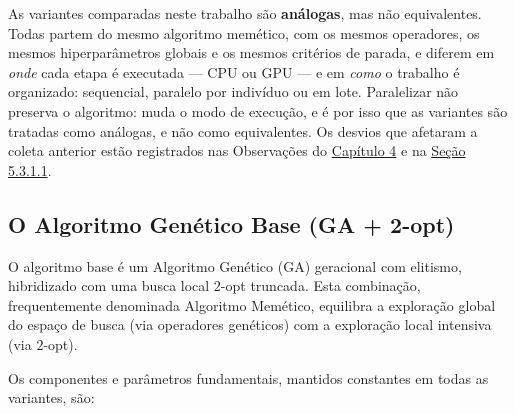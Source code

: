 As variantes comparadas neste trabalho são \textbf{análogas}, mas não equivalentes.\label{obs-envelope-comparacao}
Todas partem do mesmo algoritmo memético, com os mesmos operadores, os mesmos hiperparâmetros globais e os mesmos critérios de parada, e diferem em \emph{onde} cada etapa é executada --- CPU ou GPU --- e em \emph{como} o trabalho é organizado: sequencial, paralelo por indivíduo ou em lote.
Paralelizar não preserva o algoritmo: muda o modo de execução, e é por isso que as variantes são tratadas como análogas, e não como equivalentes.
Os desvios que afetaram a coleta anterior estão registrados nas Observações do \hyperref[cap4-resultados]{Capítulo 4} e na \hyperref[sec-5311-semantica-operadores]{Seção 5.3.1.1}.

\subsection{O Algoritmo Genético Base (GA + 2-opt)}\label{sec-321-ga-base}

O algoritmo base é um Algoritmo Genético (GA) geracional com elitismo, hibridizado com uma busca local \(2\)-opt truncada.
Esta combinação, frequentemente denominada Algoritmo Memético, equilibra a exploração global do espaço de busca (via operadores genéticos) com a exploração local intensiva (via \(2\)-opt).

Os componentes e parâmetros fundamentais, mantidos constantes em todas as variantes, são:

